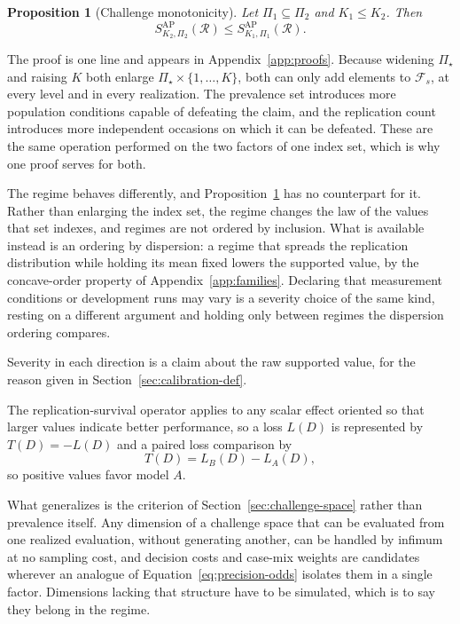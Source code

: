 \documentclass[11pt]{article}
\newcommand{\Regime}{\mathcal{R}}
\newcommand{\PSet}{\Pi_\star}
\newcommand{\RefSet}{\mathcal{F}}
\newtheorem{proposition}{Proposition}
\theoremstyle{remark}
\begin{document}
\begin{proposition}[Challenge monotonicity]
\label{prop:challenge-monotonicity}
Let $\Pi_1\subseteq\Pi_2$ and $K_1\leq K_2$. Then
\begin{equation}
S_{K_2,\Pi_2}^{\mathrm{AP}}(\Regime)
\leq
S_{K_1,\Pi_1}^{\mathrm{AP}}(\Regime).
\label{eq:challenge-monotonicity}
\end{equation}
\end{proposition}

The proof is one line and appears in Appendix~\ref{app:proofs}. Because widening $\PSet$ and raising $K$ both enlarge $\PSet\times\{1,\ldots,K\}$, both can only add elements to $\RefSet_s$, at every level and in every realization. The prevalence set introduces more population conditions capable of defeating the claim, and the replication count introduces more independent occasions on which it can be defeated. These are the same operation performed on the two factors of one index set, which is why one proof serves for both.

The regime behaves differently, and Proposition~\ref{prop:challenge-monotonicity} has no counterpart for it. Rather than enlarging the index set, the regime changes the law of the values that set indexes, and regimes are not ordered by inclusion. What is available instead is an ordering by dispersion: a regime that spreads the replication distribution while holding its mean fixed lowers the supported value, by the concave-order property of Appendix~\ref{app:families}. Declaring that measurement conditions or development runs may vary is a severity choice of the same kind, resting on a different argument and holding only between regimes the dispersion ordering compares.

Severity in each direction is a claim about the raw supported value, for the reason given in Section~\ref{sec:calibration-def}.


The replication-survival operator applies to any scalar effect oriented so that larger values indicate better performance, so a loss $L(D)$ is represented by $T(D)=-L(D)$ and a paired loss comparison by
\[
T(D)=L_B(D)-L_A(D),
\]
so positive values favor model $A$.

What generalizes is the criterion of Section~\ref{sec:challenge-space} rather than prevalence itself. Any dimension of a challenge space that can be evaluated from one realized evaluation, without generating another, can be handled by infimum at no sampling cost, and decision costs and case-mix weights are candidates wherever an analogue of Equation~\eqref{eq:precision-odds} isolates them in a single factor. Dimensions lacking that structure have to be simulated, which is to say they belong in the regime.
\end{document}
